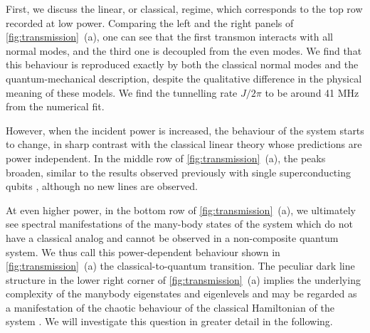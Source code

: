 \documentclass[%
 aps, pra,
 amsmath,amssymb,
 reprint,%
superscriptaddress
]{revtex4-2}
\begin{document}
First, we discuss the linear, or classical, regime, which corresponds to the top row recorded at low power. Comparing the left and the right panels of \autoref{fig:transmission}~(a), one can see that the first transmon interacts with all normal modes, and the third one is decoupled from the even modes. We find that this behaviour is reproduced exactly by both the classical normal modes and the quantum-mechanical description, despite the qualitative difference in the physical meaning of these models. We find the tunnelling rate $J/2\pi$ to be around 41 MHz from the numerical fit.

However, when the incident power is increased, the behaviour of the system starts to change, in sharp contrast with the classical linear theory whose predictions are power independent. In the middle row of \autoref{fig:transmission}~(a), the peaks broaden, similar to the results observed previously with single superconducting qubits  \cite{astafiev2010resonance}, although no new lines are observed. 

At even higher power, in the bottom row of \autoref{fig:transmission}~(a), we ultimately see spectral manifestations of the many-body states of the system which do not have a classical analog and cannot be observed in a non-composite quantum system. We thus call this power-dependent behaviour shown in \autoref{fig:transmission}~(a) the classical-to-quantum transition. The peculiar dark line structure in the lower right corner of \autoref{fig:transmission}~(a) implies the underlying complexity of the manybody eigenstates and eigenlevels and may be regarded as a manifestation of the chaotic behaviour of the classical Hamiltonian of the system \cite{zimmermann1986manifestation}. We will investigate this question in greater detail in the following.
\end{document}
